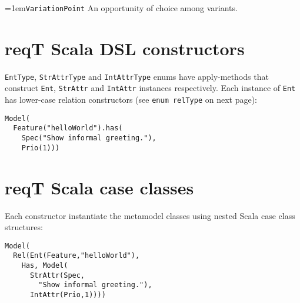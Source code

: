\documentclass[a4paper,oneside]{article}
\newcommand\Concept[2]{\hangindent=1em\lstinline+#1+ #2}
\begin{document}
\begin{multicols*}{4}
\Concept{VariationPoint}{An opportunity of choice among variants.}



\section*{reqT Scala DSL constructors}
\lstinline+EntType+, \lstinline+StrAttrType+ and \lstinline+IntAttrType+ enums have apply-methods that construct \lstinline+Ent+, \lstinline+StrAttr+ and \lstinline+IntAttr+ instances respectively. Each instance of \lstinline+Ent+ has lower-case relation constructors (see \lstinline+enum relType+ on next page):
\begin{lstlisting}
Model(
  Feature("helloWorld").has(
    Spec("Show informal greeting."),
    Prio(1)))

\end{lstlisting}


\section*{reqT Scala case classes}
Each constructor instantiate the metamodel classes using nested Scala case class structures:
\begin{lstlisting}
Model(
  Rel(Ent(Feature,"helloWorld"),
    Has, Model(
      StrAttr(Spec,
        "Show informal greeting."),
      IntAttr(Prio,1))))

\end{lstlisting}

\end{multicols*}
\end{document}
